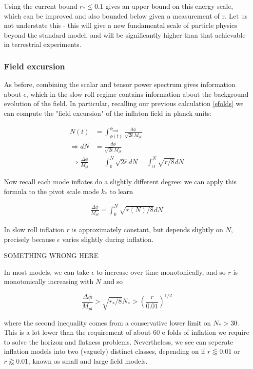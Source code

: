 \documentclass[a4paper,11pt]{article}
\newcommand{\Mp}{M_{pl}}
\begin{document}
Using the current bound $r_*\leq 0.1$ gives an upper bound on this energy scale, which can be improved and also bounded below given a measurement of r. Let us not understate this - this will give a new fundamental scale of particle physics beyond the standard model, and will be significantly higher than that achievable in terrestrial experiments.


\subsubsection{Field excursion}

As before, combining the scalar and tensor power spectrum gives information about $\epsilon$, which in the slow roll regime contains information about the background evolution of the field. In particular, recalling our previous calculation \ref{efolds} we can compute the "field excursion" of the inflaton field in planck units:

\begin{align}
N(t) &=  \int_{\phi(t)}^{\phi_{end}} \frac{d\phi}{\sqrt{2\epsilon}\Mp}\\
\Rightarrow dN&=\frac{d\phi}{\sqrt{2\epsilon}\Mp}\\
\Rightarrow \frac{\Delta \phi}{\Mp} &= \int_0^N \sqrt{2\epsilon} dN = \int_0^N \sqrt{r/8} dN 
\end{align}

Now recall each mode inflates do a slightly different degree: we can apply this formula to the pivot scale mode $k_*$ to learn 

\begin{align}
\frac{\Delta \phi}{\Mp} =  \int_0^N \sqrt{r(N)/8} dN 
\end{align}

In slow roll inflation $r$ is approximately constant, but depends slightly on $N$, precisely because $\epsilon$ varies slightly during inflation. 

SOMETHING WRONG HERE

In most models, we can take $\epsilon$ to increase over time monotonically, and so $r$ is monotonically increasing with $N$ and so

\begin{equation}
\frac{\Delta \phi}{\Mp} > \sqrt{r_*/8}N_* > (\frac{r}{0.01})^{1/2}
\end{equation}

where the second inequality comes from a conservative lower limit on $N_* > 30$. This is a lot lower than the requirement of about 60 e folds of inflation we require to solve the horizon and flatness problems. Nevertheless, we see can seperate inflation models into two (vaguely) distinct classes, depending on if $r\lessapprox 0.01$ or $r\gtrapprox 0.01$, known as small and large field models. 
\end{document}
